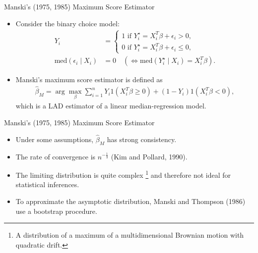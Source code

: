\documentclass[xcolor=svgnames,dvipdfmx,cjk]{beamer}
\theoremstyle{example}
\begin{document}
\begin{frame}{Manski's (1975, 1985) Maximum Score Estimator}
\begin{itemize}
  \item Consider the binary choice model:
        \begin{align*}
          Y_i &= \left\{
            \begin{array}{l}
              1 \text{ if } Y_i^{\star} = X_i^T \beta + \epsilon_i > 0, 
              \\ 
              0 \text{ if } Y_i^{\star} = X_i^T \beta + \epsilon_i \leq 0,
            \end{array}
            \right. \\
          \text{med}(\epsilon_i \mid X_i) &= 0 \quad(\iff \text{med}(Y_i^{\star}\mid X_i)=X_i^T\beta) .
        \end{align*}
  \item \alert{Manski's maximum score estimator} is defined as
        \begin{align*}
          \hat{\beta}_M 
           =\arg \max_{\beta} 
             \sum_{i=1}^{n} Y_i 1(X_i^T \beta \geq 0)
                            +
                        (1-Y_i) 1(X_i^T \beta < 0),
        \end{align*}
        which is a LAD estimator of a linear median-regression model.
\end{itemize}
\end{frame}  
  
\begin{frame}{Manski's (1975, 1985) Maximum Score Estimator}
\begin{itemize}
  \item Under some assumptions, $\hat{\beta}_M$ has strong consistency.
  \item The rate of convergence is $n^{-\frac{1}{3}}$ (Kim and Pollard, 1990).
  \item The limiting distribution is quite complex
        \footnote{A distribution of a maximum of a multidimensional Brownian motion with quadratic drift.}
        and therefore not ideal for statistical inferences.
  \item To approximate the asymptotic distribution, 
        Manski and Thompson (1986) use a bootstrap procedure.
\end{itemize}
\end{frame}   
  

  
\end{document}
